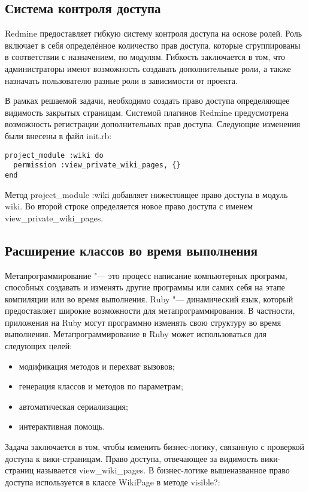\subsection{Система контроля доступа}
\label{section:access_control}
Redmine предоставляет гибкую систему контроля доступа на основе ролей. Роль
включает в себя определённое количество прав доступа, которые сгруппированы в
соответствии с назначением, по модулям. Гибкость заключается в том, что
администраторы имеют возможность создавать дополнительные роли, а также
назначать пользователю разные роли в зависимости от проекта.

В рамках решаемой задачи, необходимо создать право доступа определяющее
видимость закрытых страницам. Системой плагинов Redmine предусмотрена
возможность регистрации дополнительных прав доступа. Следующие изменения были
внесены в файл init.rb:

\small{
\begin{lstlisting}
project_module :wiki do
  permission :view_private_wiki_pages, {}
end
\end{lstlisting}}
Метод project\_module :wiki добавляет нижестоящее право доступа в модуль wiki.
Во второй строке определяется новое право доступа с именем
view\_private\_wiki\_pages.  


\subsection{Расширение классов во время выполнения}
\label{section:metaprogramming} 
Метапрограммирование "--- это процесс написание компьютерных программ,
способных создавать и изменять другие программы или самих себя на этапе
компиляции или во время выполнения. Ruby "--- динамический язык, который
предоставляет широкие возможности для метапрограммирования. В частности,
приложения на Ruby могут программно изменять свою структуру во время
выполнения. Метапрограммирование в Ruby может использоваться для следующих
целей:
\begin{itemize}
  \item модификация методов и перехват вызовов;
  \item генерация классов и методов по параметрам;
  \item автоматическая сериализация;
  \item интерактивная помощь.
\end{itemize}

Задача заключается в том, чтобы изменить бизнес-логику, связанную с проверкой
доступа к вики-страницам. Право доступа, отвечающее за видимость вики-страниц
называется view\_wiki\_pages. В бизнес-логике вышеназванное право доступа
используется в классе WikiPage в методе visible?:

